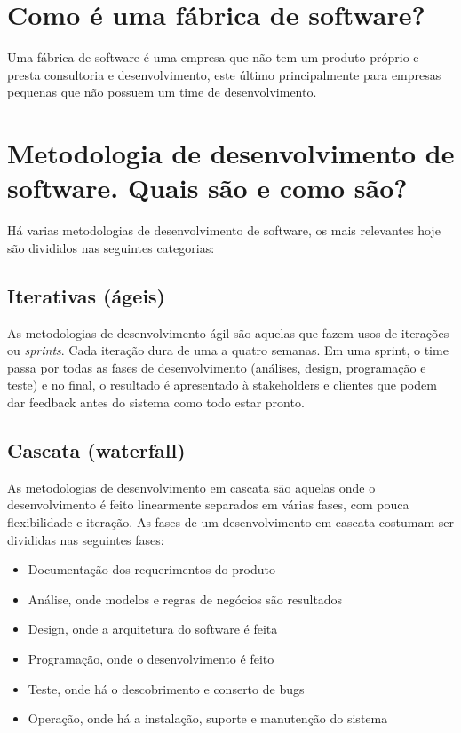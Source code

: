 \documentclass[11pt]{article}
\begin{document}
\section{Como é uma fábrica de software?}
\label{sec:org6a6c0b4}
Uma fábrica de software é uma empresa que não tem um produto próprio e presta
consultoria e desenvolvimento, este último principalmente para empresas pequenas
que não possuem um time de desenvolvimento.

\section{Metodologia de desenvolvimento de software. Quais são e como são?}
\label{sec:org559cf9d}
Há varias metodologias de desenvolvimento de software, os mais relevantes hoje
são divididos nas seguintes categorias:
\subsection{Iterativas (ágeis)}
\label{sec:orged61b1d}
As metodologias de desenvolvimento ágil são aquelas que fazem usos de iterações
ou \emph{sprints}. Cada iteração dura de uma a quatro semanas. Em uma sprint, o time
passa por todas as fases de desenvolvimento (análises, design, programação e
teste) e no final, o resultado é apresentado à stakeholders e clientes que podem
dar feedback antes do sistema como todo estar pronto.

\subsection{Cascata (waterfall)}
\label{sec:org0dfa827}
As metodologias de desenvolvimento em cascata são aquelas onde o desenvolvimento
é feito linearmente separados em várias fases, com pouca flexibilidade e
iteração. As fases de um desenvolvimento em cascata costumam ser divididas nas
seguintes fases:
\begin{itemize}
\item Documentação dos requerimentos do produto
\item Análise, onde modelos e regras de negócios são resultados
\item Design, onde a arquitetura do software é feita
\item Programação, onde o desenvolvimento é feito
\item Teste, onde há o descobrimento e conserto de bugs
\item Operação, onde há a instalação, suporte e manutenção do sistema
\end{itemize}
\end{document}
